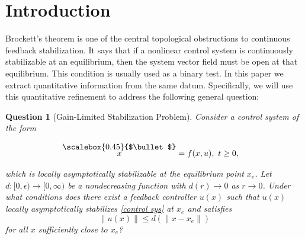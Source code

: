 \documentclass[pdflatex,sn-mathphys-num]{sn-jnl}%
\renewcommand{\dot}[1]
    {
    \overset{\raisebox{0ex}{\scalebox{0.45}{$\bullet$}}}{#1}
    }
\theoremstyle{thmstyleone}%
\newtheorem{question}[theorem]{Question}
\theoremstyle{thmstyletwo}%
\theoremstyle{thmstylethree}%
\begin{document}

\maketitle


\section{Introduction}


    Brockett's theorem is one of the central topological obstructions to continuous feedback stabilization. It says that if a nonlinear control system is continuously stabilizable at an equilibrium, then the system vector field must be open at that equilibrium. This condition is usually used as a binary test. In this paper we extract quantitative information from the same datum.  Specifically, we will use this quantitative refinement to address the following general question:
    
    
    \begin{question}[Gain-Limited Stabilization Problem]\label{question}
        Consider a control system of the form 
        
        
        \begin{align}
            \dot{x}=f(x,u), & \enskip t \geq 0, \label{control sys}
        \end{align}
        
        
        \noindent which is locally asymptotically stabilizable at the equilibrium point $x_e$.  Let $d:[0,\epsilon)\to[0,\infty)$ be a nondecreasing function with $d(r)\to 0$ as $r \to 0$. Under what conditions does there exist a feedback controller $u(x)$ such that $u(x)$ locally asymptotically stabilizes \eqref{control sys} at $x_e$ and satisfies 
        \begin{equation}\label{question rate}
            \|u(x)\| \leq d(\|x - x_e\|)
        \end{equation} for all $x$ sufficiently close to $ x_e$?
    \end{question}
    
\end{document}
